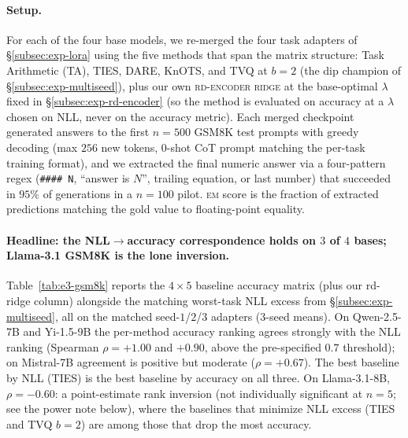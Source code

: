 \paragraph{Setup.} For each of the four base models, we re-merged
the four task adapters of \S\ref{subsec:exp-lora} using the five
methods that span the matrix structure: Task Arithmetic (TA), TIES,
DARE, KnOTS, and TVQ at $b=2$ (the dip champion of
\S\ref{subsec:exp-multiseed}), plus our own \textsc{rd-encoder ridge}
at the base-optimal $\lambda$ fixed in \S\ref{subsec:exp-rd-encoder}
(so the method is evaluated on accuracy at a $\lambda$ chosen on NLL,
never on the accuracy metric). Each merged checkpoint generated
answers to the first $n=500$ GSM8K test prompts with greedy decoding
(max $256$ new tokens, $0$-shot CoT prompt matching the per-task
training format), and we extracted the final numeric answer via
a four-pattern regex (\verb|#### N|, ``answer is $N$'', trailing
equation, or last number) that succeeded in $95\%$ of generations
in a $n=100$ pilot. \textsc{em} score is the fraction of extracted
predictions matching the gold value to floating-point equality.

\paragraph{Headline: the NLL$\to$accuracy correspondence holds on
$3$ of $4$ bases; Llama-3.1 GSM8K is the lone inversion.}
Table~\ref{tab:e3-gsm8k} reports the $4 \times 5$ baseline accuracy
matrix (plus our rd-ridge column) alongside the matching worst-task
NLL excess from \S\ref{subsec:exp-multiseed}, all on the matched
seed-$1$/$2$/$3$ adapters ($3$-seed means). On Qwen-2.5-7B and
Yi-1.5-9B the per-method accuracy ranking agrees strongly with the NLL
ranking (Spearman $\rho = +1.00$ and $+0.90$, above the pre-specified
$0.7$ threshold); on Mistral-7B agreement is positive but moderate
($\rho = +0.67$). The best baseline by NLL (TIES) is the best baseline
by accuracy on all three. On Llama-3.1-8B, $\rho = -0.60$: a
point-estimate rank inversion (not individually significant at $n=5$;
see the power note below), where the baselines that minimize NLL excess
(TIES and TVQ $b=2$) are among those that drop the most accuracy.

